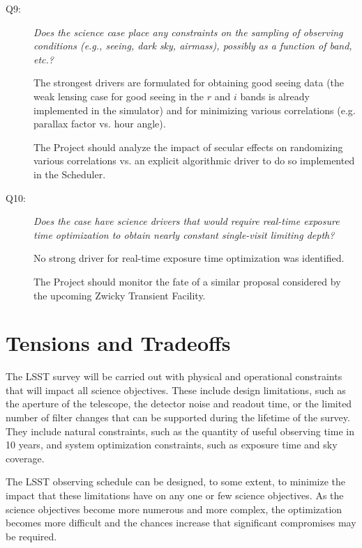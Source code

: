 \begin{description}
\item[Q9:] {\it Does the science case place any constraints on the
sampling of observing conditions (e.g., seeing, dark sky, airmass),
possibly as a function of band, etc.?}

The strongest drivers are formulated for obtaining good seeing data (the
weak lensing case for good seeing in the $r$ and $i$ bands is already
implemented in the simulator) and for minimizing various correlations
(e.g. parallax factor vs. hour angle).

The Project should analyze the impact of secular effects on randomizing
various correlations vs. an explicit algorithmic driver to do so
implemented in the Scheduler.


\item[Q10:] {\it Does the case have science drivers that would require
real-time exposure time optimization to obtain nearly constant
single-visit limiting depth?}

No strong driver for real-time exposure time optimization was
identified.

The Project should monitor the fate of a similar proposal considered by
the upcoming Zwicky Transient Facility.

\end{description}



\section{Tensions and Tradeoffs}


The LSST survey will be carried out with physical and operational
constraints that will impact all science objectives.  These include
design limitations, such as the aperture of the telescope, the detector
noise and readout time, or the limited number of filter changes that
can be supported during the lifetime of the survey.  They include
natural constraints, such as the quantity of useful observing time
in 10 years, and system optimization constraints, such as
exposure time and sky coverage.

The LSST observing schedule can be designed, to some extent, to minimize
the impact that these limitations have on any one or few science
objectives. As the science objectives become more numerous and more
complex, the optimization becomes more difficult and the chances
increase that significant compromises may be required.

